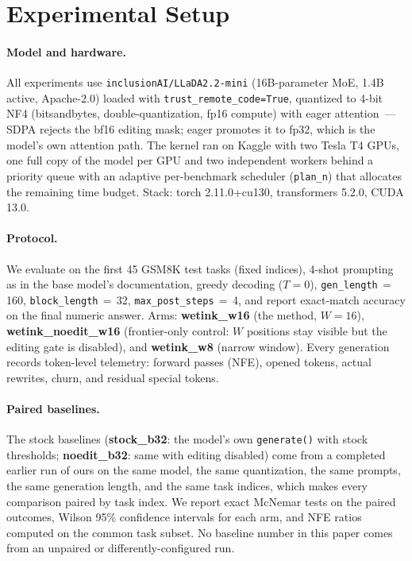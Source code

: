 \section{Experimental Setup}\label{sec:setup}

\paragraph{Model and hardware.}
All experiments use \texttt{inclusionAI/LLaDA2.2-mini} (16B-parameter MoE, 1.4B
active, Apache-2.0) \citep{llada22mini} loaded with
\texttt{trust\_remote\_code=True}, quantized to 4-bit NF4 (bitsandbytes,
double-quantization, fp16 compute) with eager attention~--- SDPA rejects the bf16
editing mask; eager promotes it to fp32, which is the model's own attention path.
The kernel ran on Kaggle with two Tesla T4 GPUs, one full copy of the model per
GPU and two independent workers behind a priority queue with an adaptive
per-benchmark scheduler (\texttt{plan\_n}) that allocates the remaining time
budget. Stack: torch 2.11.0+cu130, transformers 5.2.0, CUDA 13.0.

\paragraph{Protocol.}
We evaluate on the first 45 GSM8K test tasks (fixed indices), 4-shot prompting as
in the base model's documentation, greedy decoding ($T{=}0$),
\texttt{gen\_length}$\,{=}\,$160, \texttt{block\_length}$\,{=}\,$32,
\texttt{max\_post\_steps}$\,{=}\,$4, and report exact-match accuracy on the final
numeric answer. Arms: \textbf{wetink\_w16} (the method, $W{=}16$),
\textbf{wetink\_noedit\_w16} (frontier-only control: $W$ positions stay visible
but the editing gate is disabled), and \textbf{wetink\_w8} (narrow window). Every
generation records token-level telemetry: forward passes (NFE), opened tokens,
actual rewrites, churn, and residual special tokens.

\paragraph{Paired baselines.}
The stock baselines (\textbf{stock\_b32}: the model's own \texttt{generate()} with
stock thresholds; \textbf{noedit\_b32}: same with editing disabled) come from a
completed earlier run of ours on the same model, the same quantization, the same
prompts, the same generation length, and the same task indices, which makes every
comparison paired by task index. We report exact McNemar tests on the paired
outcomes, Wilson 95\% confidence intervals for each arm, and NFE ratios computed
on the common task subset. No baseline number in this paper comes from an
unpaired or differently-configured run.

